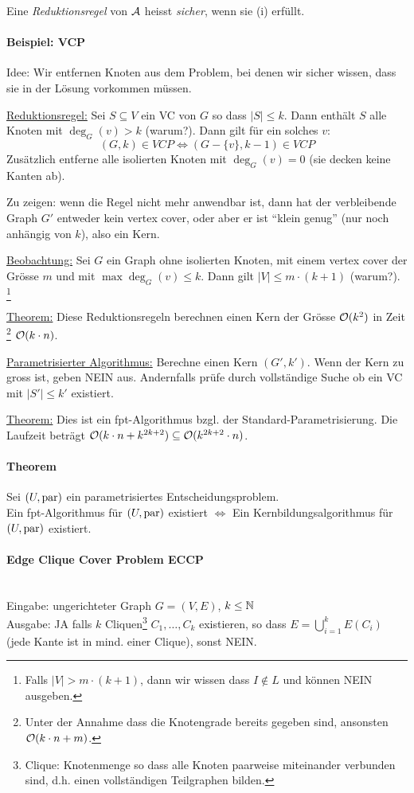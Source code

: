 Eine \emph{Reduktionsregel} von $\mathcal{A}$ heisst \emph{sicher}, wenn sie (i) erfüllt.

\paragraph{Beispiel: VCP}
Idee: Wir entfernen Knoten aus dem Problem, bei denen wir sicher wissen, dass sie in der Lösung vorkommen müssen.

\underline{Reduktionsregel:}
Sei $S \subseteq V$ ein VC von $G$ so dass $|S| \leq k$. Dann enthält $S$ alle Knoten mit $\deg_G(v) > k$ (warum?).
Dann gilt für ein solches $v$:
$$ (G, k) \in VCP \iff (G-\{v\}, k-1) \in VCP $$
Zusätzlich entferne alle isolierten Knoten mit $\deg_G(v) = 0$ (sie decken keine Kanten ab).

Zu zeigen: wenn die Regel nicht mehr anwendbar ist, dann hat der verbleibende Graph $G'$ entweder kein vertex cover,
oder aber er ist ``klein genug'' (nur noch anhängig von $k$), also ein Kern.

\underline{Beobachtung:}
Sei $G$ ein Graph ohne isolierten Knoten, mit einem vertex cover der Grösse $m$ und mit $\max \deg_G(v) \leq k$.
Dann gilt $|V| \leq m \cdot (k+1)$ (warum?).%
\footnote{Falls $|V| > m \cdot (k+1)$, dann wir wissen dass $I \notin L$ und können NEIN ausgeben.}

\underline{Theorem:}
Diese Reduktionsregeln berechnen einen Kern der Grösse $\mathcal{O} (k^2)$ in Zeit%
\footnote{Unter der Annahme dass die Knotengrade bereits gegeben sind, ansonsten $\mathcal{O} (k \cdot n + m)$.}
$\mathcal{O} (k \cdot n)$.

\underline{Parametrisierter Algorithmus:}
Berechne einen Kern $(G', k')$. Wenn der Kern zu gross ist, geben NEIN aus.
Andernfalls prüfe durch vollständige Suche ob ein VC mit $|S'| \leq k'$ existiert.

\underline{Theorem:}
Dies ist ein fpt-Algorithmus bzgl. der Standard-Parametrisierung. Die Laufzeit beträgt
$\mathcal{O} (k \cdot n + k^{2k+2}) \subseteq \mathcal{O} (k^{2k+2} \cdot n)$.

\paragraph{Theorem}
Sei $(U, \text{par})$ ein parametrisiertes Entscheidungsproblem. \\
Ein fpt-Algorithmus für $(U, \text{par})$ existiert $\iff$ Ein Kernbildungsalgorithmus für $(U, \text{par})$ existiert.

\paragraph{Edge Clique Cover Problem ECCP} \mbox{} \\
Eingabe: ungerichteter Graph $G=(V,E)$, $k \leq \mathbb{N}$ \\
Ausgabe: JA falls $k$ Cliquen\footnote{Clique: Knotenmenge so dass alle Knoten paarweise miteinander verbunden sind,
d.h. einen vollständigen Teilgraphen bilden.}
$C_1, \dots, C_k$ existieren, so dass $E = \bigcup_{i=1}^k E(C_i)$ (jede Kante ist in mind. einer Clique), sonst NEIN.

